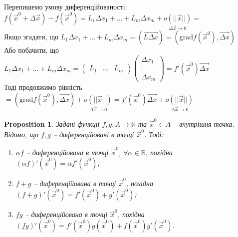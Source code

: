 \documentclass[a4paper, 10pt]{article}
\def\bigline{\vspace{5mm}\\}
\theoremstyle{theoremdd}
\theoremstyle{theoremdd}
\theoremstyle{theoremdd}
\theoremstyle{theoremdd}
\theoremstyle{theoremdd}
\theoremstyle{theoremdd}
\newtheorem{proposition}[theorem]{Proposition}
\theoremstyle{theoremdd}
\theoremstyle{theoremdd}
\theoremstyle{theoremdd}
\begin{document}
Перепишемо умову диференційованості:\\
$f(\vec{x}^0 + \Delta \vec{x}) - f(\vec{x}^0) = L_1 \Delta x_1 + \dots + L_m \Delta x_m + \underset{\Delta \vec{x} \to 0}{o(||\vec{x}||)} \boxed{=}$\\
Якщо згадати, що $L_1 \Delta x_1 + \dots + L_m \Delta x_m = \left( \overrightarrow{L} \overrightarrow{\Delta x} \right) = \left(\textrm{grad} f(\vec{x}^0), \overrightarrow{\Delta x}\right)$\\
Або побачити, що $L_1 \Delta x_1 + \dots + L_m \Delta x_m = \begin{pmatrix}
L_1 & \dots & L_m
\end{pmatrix} \begin{pmatrix}
\Delta x_1 \\ \vdots \\ \Delta x_m
\end{pmatrix} = f'(\vec{x}^0) \overrightarrow{\Delta x}$\\
Тоді продовжимо рівність\\
$\boxed{=} \left(\textrm{grad} f(\vec{x}^0), \overrightarrow{\Delta x}\right) + \underset{\Delta \vec{x} \to 0}{o(||\vec{x}||)} = f'(\vec{x}^0) \overrightarrow{\Delta x} + \underset{\Delta \vec{x} \to 0}{o(||\vec{x}||)}$
\bigline
\fi

\begin{proposition}
Задані функції $f,g\colon A \to \mathbb{R}$ та $\vec{x}^0 \in A$ -- внутрішня точка. Відомо, що $f,g$ -- диференційовані в точці $\vec{x}^0$. Тоді:
\begin{enumerate}[nosep,wide=0pt,label={\arabic*)}]
\item $\alpha f$ -- диференційована в точці $\vec{x}^0$, $\forall \alpha \in \mathbb{R}$, похідна $(\alpha f)'(\vec{x}^0) = \alpha f'(\vec{x}^0)$;
\item $f + g$ -- диференційована в точці $\vec{x}^0$, похідна $(f+g)'(\vec{x}^0) = f'(\vec{x}^0)+g'(\vec{x}^0)$;
\item $fg$ -- диференційована в точці $\vec{x}^0$, похідна $(fg)'(\vec{x}^0) = f'(\vec{x}^0) g(\vec{x}^0) + f(\vec{x}^0)g'(\vec{x}^0)$.
\end{enumerate}
\end{proposition}
\end{document}
